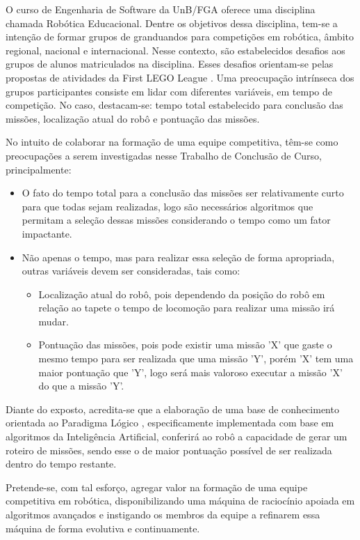 O curso de Engenharia de Software da UnB/FGA oferece uma disciplina chamada Robótica Educacional. Dentre os objetivos dessa disciplina, tem-se a intenção de formar grupos de granduandos para competições em robótica, âmbito regional, nacional e internacional. Nesse contexto, são estabelecidos desafios aos grupos de alunos matriculados na disciplina. Esses desafios orientam-se pelas propostas de atividades da First LEGO League \cite{kamenfirst}. Uma preocupação intrínseca dos grupos participantes consiste em lidar com diferentes variáveis, em tempo de competição. No caso, destacam-se: tempo total estabelecido para conclusão das missões, localização atual do robô e pontuação das missões.

No intuito de colaborar na formação de uma equipe competitiva, têm-se como preocupações a serem investigadas nesse Trabalho de Conclusão de Curso, principalmente:

\begin{itemize}
\item O fato do tempo total para a conclusão das missões ser relativamente curto para que todas sejam realizadas, logo são necessários algoritmos que permitam a seleção dessas missões considerando o tempo como um fator impactante.

\item Não apenas o tempo, mas para realizar essa seleção de forma apropriada, outras variáveis devem ser consideradas, tais como: 
\begin{itemize}
\item Localização atual do robô, pois dependendo da posição do robô em relação ao tapete o tempo de locomoção para realizar uma missão irá mudar.   
\item Pontuação das missões, pois pode existir uma missão 'X' que gaste o mesmo tempo para ser realizada que uma missão 'Y', porém 'X' tem uma maior pontuação que 'Y', logo será mais valoroso executar a missão 'X' do que a missão 'Y'.
\end{itemize} 
\end{itemize}
 

Diante do exposto, acredita-se que a elaboração de uma base de conhecimento orientada ao Paradigma Lógico \cite[chap. 15]{tucker2009linguagens}, especificamente implementada com base em algoritmos da Inteligência Artificial, conferirá ao robô a capacidade de gerar um roteiro de missões, sendo esse o de maior pontuação possível de ser realizada dentro do tempo restante.

Pretende-se, com tal esforço, agregar valor na formação de uma equipe competitiva em robótica, disponibilizando uma máquina de raciocínio apoiada em algoritmos avançados e instigando os membros da equipe a refinarem essa máquina de forma evolutiva e continuamente.

